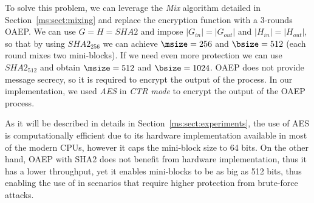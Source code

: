 {To solve this problem, we can leverage the {\em Mix} algorithm detailed in Section~\ref{ms:sect:mixing} and replace the encryption function with a 3-rounds OAEP.
We can use $G = H = SHA2$ and impose $|G_{in}| = |G_{out}|$ and $|H_{in}| = |H_{out}|$, so that by using $SHA2_{256}$ we can achieve $\msize = 256$ and $\bsize = 512$ (each round mixes two mini-blocks). If we need even more protection we can use $SHA2_{512}$ and obtain $\msize = 512$ and $\bsize = 1024$. OAEP does not provide message secrecy, so it is required to encrypt the output of the process. In our implementation, we used {\em AES} in {\em CTR mode} to encrypt the output of the OAEP process.

As it will be described in details in Section~\ref{ms:sect:experiments}, the use of AES is computationally efficient due to its hardware implementation available in most of the modern CPUs, however it caps the mini-block size to 64 bits. On the other hand, OAEP with SHA2 does not benefit from hardware implementation, thus it has a lower throughput, yet it enables mini-blocks to be as big as 512 bits, thus enabling the use of \name in scenarios that require higher protection from brute-force attacks.

} %


